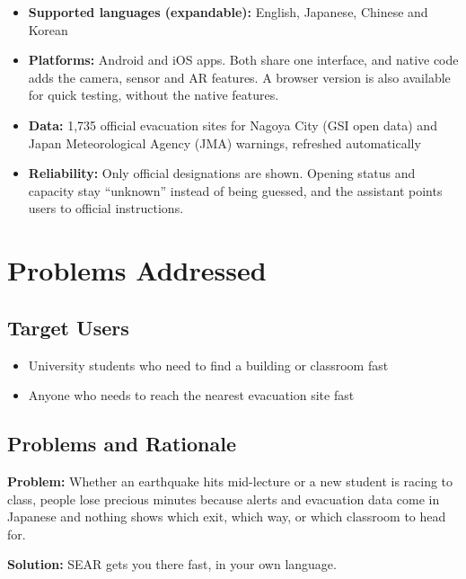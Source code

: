 \documentclass[11pt,a4paper]{article}
\begin{document}
\begin{itemize}[leftmargin=1.4em,itemsep=2pt,topsep=4pt]
  \item \textbf{Supported languages (expandable):} English, Japanese, Chinese and Korean
  \item \textbf{Platforms:} Android and iOS apps. Both share one interface, and native code
        adds the camera, sensor and AR features. A browser version is also available for quick
        testing, without the native features.
  \item \textbf{Data:} 1,735 official evacuation sites for Nagoya City (GSI open data)
        and Japan Meteorological Agency (JMA) warnings, refreshed automatically
  \item \textbf{Reliability:} Only official designations are shown. Opening status and
        capacity stay ``unknown'' instead of being guessed, and the assistant points
        users to official instructions.
\end{itemize}

\section{Problems Addressed}

\subsection{Target Users}
\begin{itemize}[leftmargin=1.4em,itemsep=2pt,topsep=4pt]
  \item University students who need to find a building or classroom fast
  \item Anyone who needs to reach the nearest evacuation site fast
\end{itemize}

\subsection{Problems and Rationale}

\noindent\textbf{Problem:} Whether an earthquake hits mid-lecture or a new student is racing to
class, people lose precious minutes because alerts and evacuation data come in Japanese and
nothing shows which exit, which way, or which classroom to head for.

\medskip
\noindent\textbf{Solution:} SEAR gets you there fast, in your own language.
\end{document}
